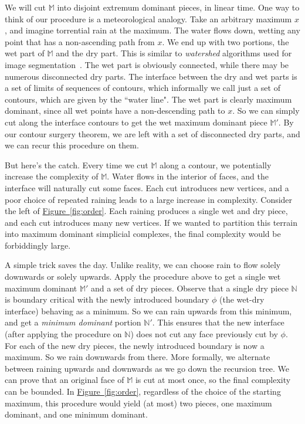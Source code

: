 \documentclass[11pt]{article}
\theoremstyle{definition}
\newcommand{\MM}{\mathbb{M}}
\newcommand{\NN}{\mathbb{N}}
\newcommand{\Fig}[1]{\hyperref[fig:#1]{Figure~\ref*{fig:#1}}} %
\begin{document}
{We will cut $\MM$ into disjoint extremum dominant pieces, in linear time.
One way to think of our procedure is a meteorological analogy. Take an arbitrary maximum $x$,
and imagine torrential rain at the maximum. The water flows down, wetting any point that has a non-ascending path 
from $x$. We end up with two portions, the wet part of $\MM$ and the dry part. This is similar
to \emph{watershed} algorithms used for image segmentation~\cite{RoMe00}. The wet part is obviously connected,
while there may be numerous disconnected dry parts. The interface between the dry and wet parts
is a set of limits of sequences of contours, which informally we call just a set of contours, which are
given by the ``water line". The wet part is clearly maximum dominant, since all
wet points have a non-descending path to $x$. So we can simply cut along the interface
contours to get the wet maximum dominant piece $\MM'$. By our contour surgery theorem,
we are left with a set of disconnected dry parts, and we can recur this procedure on them.

But here's the catch. Every time we cut $\MM$ along a contour, we potentially increase
the complexity of $\MM$. Water flows in the interior of faces, and the interface will naturally
cut some faces. Each cut introduces new vertices, and a poor choice of repeated raining leads
to a large increase in complexity. Consider the left of \Fig{order}. Each raining produces a single
wet and dry piece, and each cut introduces many new vertices. If we wanted to partition this terrain into 
maximum dominant simplicial complexes, the final complexity would be forbiddingly large.

A simple trick saves the day. Unlike reality, we can choose rain to flow solely downwards or solely upwards.
Apply the procedure above to get a single wet maximum dominant $\MM'$ and a set of dry pieces.
Observe that a single dry piece $\NN$ is boundary critical with the newly introduced boundary $\phi$ (the wet-dry interface) behaving as a minimum.
So we can rain upwards from this minimum, and get a \emph{minimum dominant} portion $\NN'$.
This ensures that the new interface (after applying the procedure on $\NN$) does not
cut any face previously cut by $\phi$.
For each of the new dry pieces, the newly introduced boundary is now a maximum. So we rain downwards from there.
More formally, we alternate between raining upwards and downwards as we go down the recursion tree.
We can prove that an original face of $\MM$ is cut at most once, so the final complexity can be bounded.
In \Fig{order}, regardless of the choice of the starting maximum,  this procedure would yield (at most) two pieces, 
one maximum dominant, and one minimum dominant.

}
\end{document}
